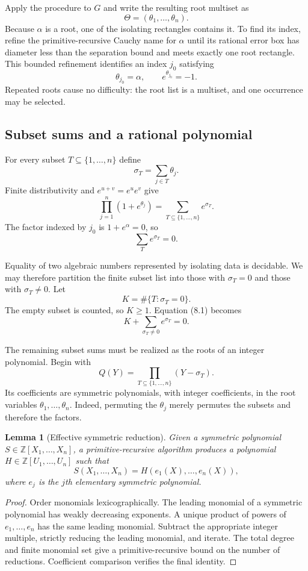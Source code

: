 \documentclass[11pt]{article}
\newtheorem{lemma}[theorem]{Lemma}
\newcommand{\Z}{\mathbb{Z}}
\begin{document}
Apply the procedure to $G$ and write the resulting root multiset as
\[
  \Theta=(\theta_1,\ldots,\theta_n).
\]
Because $\alpha$ is a root, one of the isolating rectangles contains it.  To find its index, refine the primitive-recursive Cauchy name for $\alpha$ until its rational error box has diameter less than the separation bound and meets exactly one root rectangle.  This bounded refinement identifies an index $j_0$ satisfying
\[
  \theta_{j_0}=\alpha,
  \qquad e^{\theta_{j_0}}=-1.
\]
Repeated roots cause no difficulty: the root list is a multiset, and one occurrence may be selected.

\subsection{Subset sums and a rational polynomial}

For every subset $T\subseteq\{1,\ldots,n\}$ define
\[
  \sigma_T=\sum_{j\in T}\theta_j.
\]
Finite distributivity and $e^{u+v}=e^u e^v$ give
\[
  \prod_{j=1}^n(1+e^{\theta_j})
   =\sum_{T\subseteq\{1,\ldots,n\}}e^{\sigma_T}.
\]
The factor indexed by $j_0$ is $1+e^\alpha=0$, so
\[
  \sum_T e^{\sigma_T}=0.                                    \tag{8.1}
\]

Equality of two algebraic numbers represented by isolating data is decidable.  We may therefore partition the finite subset list into those with $\sigma_T=0$ and those with $\sigma_T\ne0$.  Let
\[
  K=\#\{T:\sigma_T=0\}.
\]
The empty subset is counted, so $K\ge1$.  Equation (8.1) becomes
\[
  K+\sum_{\sigma_T\ne0}e^{\sigma_T}=0.                     \tag{8.2}
\]

The remaining subset sums must be realized as the roots of an integer polynomial.  Begin with
\[
  Q(Y)=\prod_{T\subseteq\{1,\ldots,n\}}(Y-\sigma_T).
\]
Its coefficients are symmetric polynomials, with integer coefficients, in the root variables $\theta_1,\ldots,\theta_n$.  Indeed, permuting the $\theta_j$ merely permutes the subsets and therefore the factors.

\begin{lemma}[Effective symmetric reduction]\label{lem:symmetric}
Given a symmetric polynomial $S\in\Z[X_1,\ldots,X_n]$, a primitive-recursive algorithm produces a polynomial $H\in\Z[U_1,\ldots,U_n]$ such that
\[
  S(X_1,\ldots,X_n)=H(e_1(X),\ldots,e_n(X)),
\]
where $e_j$ is the $j$th elementary symmetric polynomial.
\end{lemma}

\begin{proof}
Order monomials lexicographically.  The leading monomial of a symmetric polynomial has weakly decreasing exponents.  A unique product of powers of $e_1,\ldots,e_n$ has the same leading monomial.  Subtract the appropriate integer multiple, strictly reducing the leading monomial, and iterate.  The total degree and finite monomial set give a primitive-recursive bound on the number of reductions.  Coefficient comparison verifies the final identity.
\end{proof}
\end{document}
